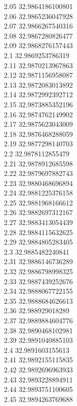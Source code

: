 {2.05	32.9864186100801\\
2.06	32.9865236047928\\
2.07	32.9866267540316\\
2.08	32.9867280826477\\
2.09	32.9868276157443\\
2.1	32.9869253786319\\
2.11	32.9870213967863\\
2.12	32.9871156958087\\
2.13	32.9872083013892\\
2.14	32.9872992392712\\
2.15	32.9873885352196\\
2.16	32.9874762149902\\
2.17	32.9875623043009\\
2.18	32.9876468288059\\
2.19	32.9877298140703\\
2.2	32.9878112855479\\
2.21	32.9878912685598\\
2.22	32.9879697882743\\
2.23	32.9880468696894\\
2.24	32.9881225376158\\
2.25	32.9881968166612\\
2.26	32.9882697312167\\
2.27	32.9883413054439\\
2.28	32.9884115632625\\
2.29	32.9884805283405\\
2.3	32.9885482240841\\
2.31	32.9886146736289\\
2.32	32.9886798998325\\
2.33	32.9887439252676\\
2.34	32.9888067722155\\
2.35	32.9888684626613\\
2.36	32.988929018289\\
2.37	32.9889884604776\\
2.38	32.9890468102981\\
2.39	32.9891040885103\\
2.4	32.9891603155613\\
2.41	32.9892155115835\\
2.42	32.9892696963933\\
2.43	32.9893228894911\\
2.44	32.9893751100605\\
2.45	32.9894263769688\\
}
